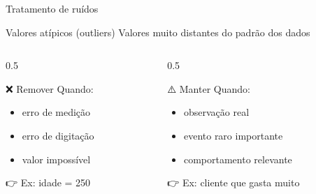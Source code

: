 \documentclass[
  ignorenonframetext,
  aspectratio=169,
]{beamer}
\providecommand{\tightlist}{%
  \setlength{\itemsep}{0pt}\setlength{\parskip}{0pt}}
\begin{document}
\begin{frame}{Tratamento de ruídos}
\label{tratamento-de-ruuxeddos-5}
\begin{block}{Valores atípicos (outliers)}
\label{valores-atuxedpicos-outliers}
Valores muito distantes do padrão dos dados
\end{block}

\begin{columns}[T]
\begin{column}{0.5\linewidth}
\begin{block}{❌ Remover}
\label{remover}
Quando:

\begin{itemize}
\tightlist
\item
  erro de medição\\
\item
  erro de digitação\\
\item
  valor impossível
\end{itemize}

👉 Ex: idade = 250
\end{block}
\end{column}

\begin{column}{0.5\linewidth}
\begin{block}{⚠️ Manter}
\label{manter}
Quando:

\begin{itemize}
\tightlist
\item
  observação real\\
\item
  evento raro importante\\
\item
  comportamento relevante
\end{itemize}

👉 Ex: cliente que gasta muito
\end{block}
\end{column}
\end{columns}
\end{frame}
\end{document}
